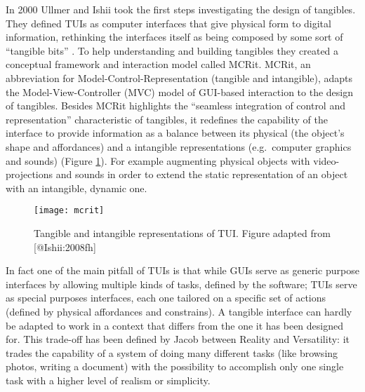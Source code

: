 In 2000 Ullmer and Ishii \autocite*{Ullmer:2000vf} took the first steps
investigating the design of tangibles. They defined TUIs as computer
interfaces that give physical form to digital information, rethinking
the interfaces itself as being composed by some sort of ``tangible
bits'' \autocite{Ishii:2008fh}. To help understanding and building
tangibles they created a conceptual framework and interaction model
called MCRit. MCRit, an abbreviation for Model-Control-Representation
(tangible and intangible), adapts the Model-View-Controller (MVC) model
of GUI-based interaction to the design of tangibles. Besides MCRit
highlights the ``seamless integration of control and representation''
characteristic of tangibles, it redefines the capability of the
interface to provide information as a balance between its physical (the
object's shape and affordances) and a intangible representations
(e.g.~computer graphics and sounds) (Figure \ref{fig:mcrit-model}). For
example augmenting physical objects with video-projections and sounds in
order to extend the static representation of an object with an
intangible, dynamic one.

\begin{figure}[tbh]
    \centering
    \texttt{[image: mcrit]}
    \caption{Tangible and intangible representations of TUI. Figure adapted from [@Ishii:2008fh]  \protect\cite{Ishii:2008fh}}
    \label{fig:mcrit-model}
\end{figure}

In fact one of the main pitfall of TUIs is that while GUIs serve as
generic purpose interfaces by allowing multiple kinds of tasks, defined
by the software; TUIs serve as special purposes interfaces, each one
tailored on a specific set of actions (defined by physical affordances
and constrains). A tangible interface can hardly be adapted to work in a
context that differs from the one it has been designed for. This
trade-off has been defined by Jacob \autocite*{Jacob:2008vm} between
Reality and Versatility: it trades the capability of a system of doing
many different tasks (like browsing photos, writing a document) with the
possibility to accomplish only one single task with a higher level of
realism or simplicity.

